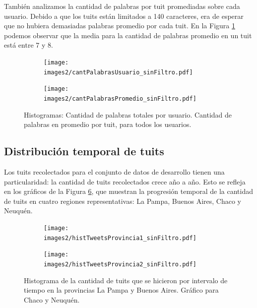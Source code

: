 También analizamos la cantidad de palabras por tuit promediadas sobre cada usuario.
Debido a que los tuits están limitados a 140 caracteres, era de esperar que no hubiera demasiadas palabras promedio por cada tuit. En la Figura \ref{fig:cantPalabrasUsuario} podemos observar que la media para la cantidad de palabras promedio en un tuit está entre 7 y 8.
\begin{figure}[!ht]\centering
  \begin{subfigure}[t]{0.49\textwidth}
    \texttt{[image: images2/cantPalabrasUsuario\_sinFiltro.pdf]}
    \caption{} 
    \label{fig:cantPalabrasUsuario} 
   \end{subfigure}
   \begin{subfigure}[t]{0.49\textwidth}
    \texttt{[image: images2/cantPalabrasPromedio\_sinFiltro.pdf]}
    \caption{} 
    \label{fig:cantPalabrasPromedio} 
   \end{subfigure}
   \caption{ Histogramas:  Cantidad de palabras totales por usuario.  Cantidad de palabras en promedio por tuit, para todos los usuarios.}
\end{figure}

\subsection{Distribución temporal de tuits}
Los tuits recolectados para el conjunto de datos de desarrollo tienen una particularidad: la cantidad de tuits recolectados crece año a año. Esto se refleja en los gráficos de la Figura \ref{fig:histTweets}, que muestran la progresión temporal de la cantidad de tuits en cuatro regiones representativas: La Pampa, Buenos Aires, Chaco y Neuquén.

\begin{figure}[!ht]\centering
   \begin{subfigure}[t]{0.49\textwidth}
     \texttt{[image: images2/histTweetsProvincia1\_sinFiltro.pdf]}
     \caption{}
     \label{fig:histTweetsProvincia1}
   \end{subfigure}
   \begin{subfigure}[t]{0.49\textwidth}
     \texttt{[image: images2/histTweetsProvincia2\_sinFiltro.pdf]}
     \caption{}
     \label{fig:histTweetsProvincia2}
   \end{subfigure}
   \caption {  Histograma de la cantidad de tuits que se hicieron por intervalo de tiempo en la provincias La Pampa y Buenos Aires.  Gráfico para Chaco y Neuquén.}
   \label{fig:histTweets}
\end{figure}




